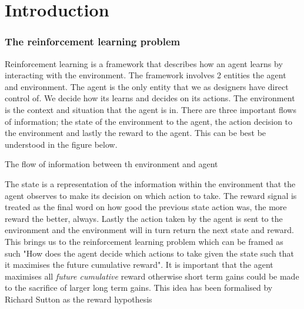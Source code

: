 \chapter{Introduction}\label{C:intro}

\subsection{The reinforcement learning problem}

Reinforcement learning is a framework that describes how an agent learns by interacting with the environment. The framework involves 2 entities the agent and environment. The agent is the only entity that we as designers have direct control of. We decide how its learns and decides on its actions. The environment is the context and situation that the agent is in. There are three important flows of information;  the state of the environment to the agent, the action decision to the environment and lastly the reward to the agent. This can be best be understood in the figure below.

\begin{fig}
\begin{center}
    \caption{The flow of information between th environment and agent}
\end{center}
\end{fig}

The state is a representation of the information within the environment that the agent observes to make its decision on which action to take. The reward signal is treated as the final word on how good the previous state action was, the more reward the better, always. Lastly the action taken by the agent is sent to the environment and the environment will in turn return the next state and reward. This brings us to the reinforcement learning problem which can be framed as such "How does the agent decide which actions to take given the state such that it maximises the future cumulative reward". It is important that the agent maximises all \textit{future cumulative} reward otherwise short term gains could be made to the sacrifice of larger long term gains. This idea has been formalised by Richard Sutton as the reward hypothesis

